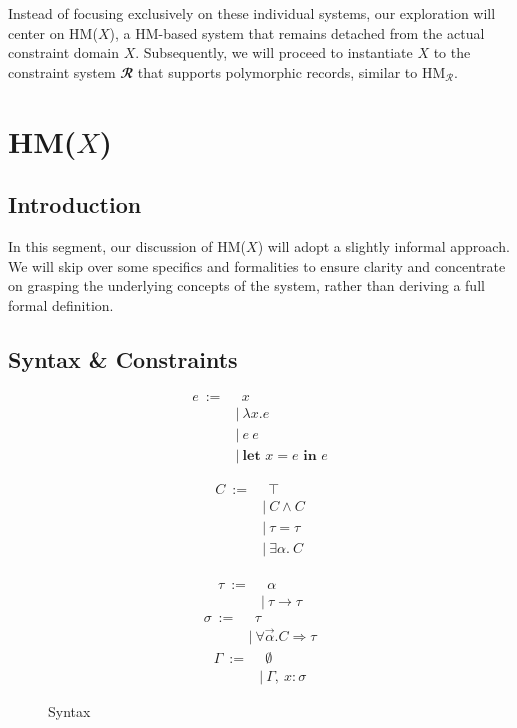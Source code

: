 \documentclass[runningheads]{llncs}
\newcommand{\hmx}{HM($X$)}
\newcommand{\kwlet}{\textbf{let }}
\newcommand{\kwin}{\textbf{ in }}
\begin{document}
Instead of focusing exclusively on these individual systems, our
exploration
will center on \hmx{}, a HM-based system that remains detached from
the actual constraint domain $X$.
Subsequently, we will proceed to instantiate $X$ to the constraint system
$𝓡$ that supports polymorphic records, similar to HM$_ℛ$.

\section{\hmx{}}

\subsection{Introduction}
In this segment, our discussion of \hmx{} will adopt a slightly informal
approach.
We will skip over some specifics and formalities to ensure clarity and
concentrate on
grasping the underlying concepts of the system, rather than deriving a
full
formal definition.

\subsection{Syntax \& Constraints}
\begin{figure}[t]
  \centering
  \begin{subfigure}[t]{0.3\textwidth}
    \begin{align*}
      e \ := & \ \ x                    \\
             & | \ λx. e                \\
             & | \ e \ e                \\
             & | \ \kwlet x = e \kwin e
    \end{align*}
  \end{subfigure}
  \begin{subfigure}[t]{0.3\textwidth}
    \begin{align*}
      C \ := & \ \ ⊤       \\
             & | \ C ∧ C   \\
             & | \ τ = τ   \\
             & | \ ∃α. \ C \\
    \end{align*}
  \end{subfigure}
  \begin{subfigure}[t]{0.3\textwidth}
    \begin{align*}
      τ \ := & \ \ α     \\
             & | \ τ → τ
    \end{align*}
    \begin{align*}
      σ \ := & \ \ τ             \\
             & | \ ∀\Vec α.C ⇒ τ
    \end{align*}
    \begin{align*}
      Γ \ := & \ \ ∅           \\
             & | \ Γ , \ x : σ
    \end{align*}
  \end{subfigure}
  \caption{Syntax}
\end{figure}
\end{document}

